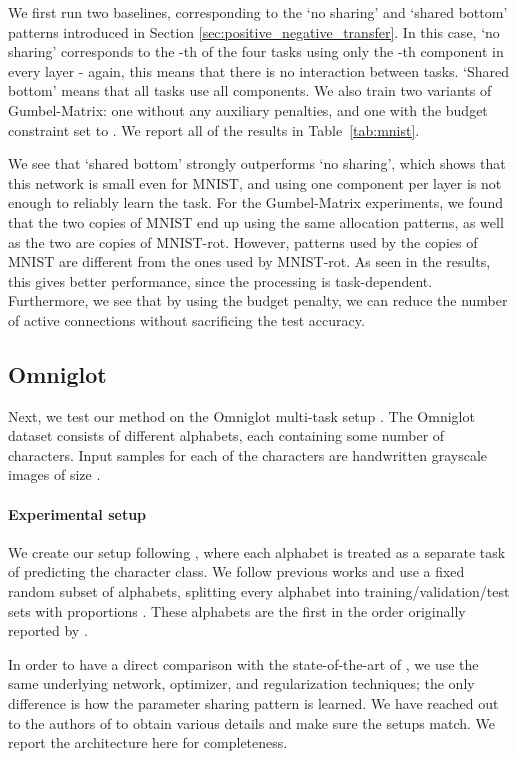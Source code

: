 \documentclass[conference]{IEEEtran}
\begin{document}
We first run two baselines, corresponding to the `no sharing' and `shared bottom' patterns introduced in Section \ref{sec:positive_negative_transfer}. In this case, `no sharing' corresponds to the -th of the four tasks using only the -th component in every layer - again, this means that there is no interaction between tasks. `Shared bottom' means that all tasks use all components. We also train two variants of Gumbel-Matrix: one without any auxiliary penalties, and one with the budget constraint set to .
We report all of the results in Table~\ref{tab:mnist}.

We see that `shared bottom' strongly outperforms `no sharing', which shows that this network is small even for MNIST, and using one component per layer is not enough to reliably learn the task.
For the Gumbel-Matrix experiments, we found that the two copies of MNIST end up using the same allocation patterns, as well as the two are copies of MNIST-rot. However, patterns used by the copies of MNIST are different from the ones used by MNIST-rot. As seen in the results, this gives better performance, since the processing is task-dependent. Furthermore, we see that by using the budget penalty, we can reduce the number of active connections without sacrificing the test accuracy.

\subsection{Omniglot}\label{subsec:omniglot}
Next, we test our method on the Omniglot multi-task setup \cite{OmniglotMT-2015}.
The Omniglot dataset consists of  different alphabets, each containing some number of characters. Input samples for each of the characters are handwritten grayscale images of size .

\paragraph{Experimental setup}

We create our setup following \cite{MeyerMiikk-ICLR-2018}, where each alphabet is treated as a separate task of predicting the character class. We follow previous works \cite{Liang-2018, Diversity&Depth-ICLR-2019} and use a fixed random subset of  alphabets, splitting every alphabet into training/validation/test sets with proportions . These alphabets are the first  in the order originally reported by \cite{MeyerMiikk-ICLR-2018}.

In order to have a direct comparison with the state-of-the-art of \cite{Diversity&Depth-ICLR-2019}, we use the same underlying network, optimizer, and regularization techniques; the only difference is how the parameter sharing pattern is learned. We have reached out to the authors of \cite{Diversity&Depth-ICLR-2019} to obtain various details and make sure the setups match. We report the architecture here for completeness.
\end{document}

